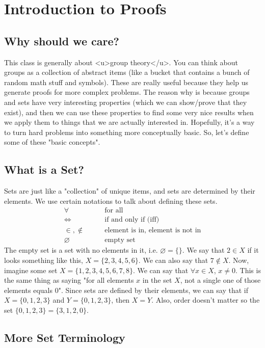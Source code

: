 \section{Introduction to Proofs}
\subsection{Why should we care?}

This class is generally about <u>group theory</u>. You can think about groups as a collection of abstract items (like a bucket that contains a bunch of random math stuff and symbols). These are really useful because they help us generate proofs for more complex problems. 
The reason why is because groups and sets have very interesting properties (which we can show/prove that they exist), and then we can use these properties to find some very nice results when we apply them to things that we are actually interested in. Hopefully, it's a way to turn hard problems into something more conceptually basic. 
So, let's define some of these "basic concepts".

\subsection{What is a Set?}
Sets are just like a "collection" of unique items, and sets are determined by their elements. We use certain notations to talk about defining these sets.
\begin{align*}
\forall \quad \quad &\text{for all} \\
\iff \quad \quad &\text{if and only if (iff)}\\
\in, \notin \quad \quad &\text{element is in, element is not in}\\
\varnothing \quad \quad &\text{empty set}
\end{align*}
The empty set is a set with no elements in it, i.e. $\varnothing = \{\}$. 
We say that $2 \in X$ if it looks something like this, $X = \{2,3,4,5,6\}$. We can also say that $7 \notin X$. 
Now, imagine some set $X = \{1,2,3,4,5,6,7,8\}$. We can say that $\forall x \in X$, $x \neq 0$. This is the same thing as saying "for all elements $x$ in the set $X$, not a single one of those elements equals $0$". 
Since sets are defined by their elements, we can say that if $X = \{0,1,2,3\}$ and $Y = \{0,1,2,3\}$, then $X = Y$. Also, order doesn't matter so the set $\{0,1,2,3\} = \{3,1,2,0\}$. 


\subsection{More Set Terminology}

